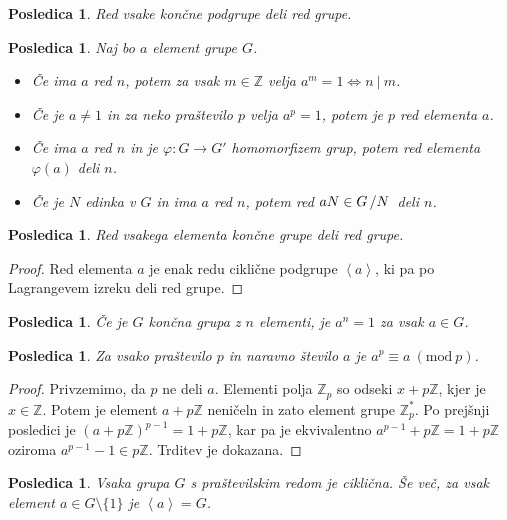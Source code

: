 \documentclass[10pt, a4paper]{article}
\newtheorem{posledica}[izr]{Posledica}
\newenvironment{noticeC}{%
  \tcolorbox[%
  notitle,
  empty,
  enhanced,  %
  breakable,
  coltext=black, 
  fontupper=\rmfamily,
  noparskip,
  sharp corners,
  boxrule=-1pt,  %
  frame hidden,
  left=7pt,  %
  right=7pt,
  top=5pt,
  bottom=5pt,
  before skip=2.5ex plus 2pt,
  after skip=2.5ex plus 2pt,
  overlay unbroken and last={%
  },
  ]}
{\endtcolorbox}
\newenvironment{dokaz}%
  {\begin{noticeC}\begin{proof}}%
  {\end{proof}\end{noticeC}}
\newcommand{\Z}{\mathbb {Z}}
\newcommand{\quot}[2]{{\raisebox{0em}{$#1$}\left/\raisebox{0em}{$#2$}\right.}}
\newcommand{\gen}[1]{\left\langle #1 \right\rangle}
\newcommand{\Mod}[1]{\ (\mathrm{mod}\ #1)}
\begin{document}
\begin{posledica}
  Red vsake končne podgrupe deli red grupe.
\end{posledica}

\begin{posledica}\label{pos:1}
  Naj bo $a$ element grupe $G$.
  \begin{itemize}
    \item Če ima $a$ red $n$, potem za vsak $m \in \Z$ velja $a^m = 1 \Leftrightarrow n\ |\ m$.
    \item Če je $a \neq 1$ in za neko praštevilo $p$ velja $a^p = 1$, potem je $p$ red elementa $a$.
    \item Če ima $a$ red $n$ in je $\varphi: G \to G'$ homomorfizem grup, potem red elementa $\varphi(a)$ deli $n$.
    \item Če je $N$ edinka v $G$ in ima $a$ red $n$, potem red $aN \in \quot{G}{N}$ deli $n$.
  \end{itemize}
\end{posledica}

\begin{posledica}
  Red vsakega elementa končne grupe deli red grupe.
\end{posledica}

\begin{dokaz}
  Red elementa $a$ je enak redu ciklične podgrupe $\gen{a}$, ki pa po Lagrangevem izreku deli red grupe.
\end{dokaz}

\begin{posledica}
  Če je $G$ končna grupa z $n$ elementi, je $a^n = 1$ za vsak $a \in G$.
\end{posledica}

\begin{posledica}
  Za vsako praštevilo $p$ in naravno število $a$ je $a^p \equiv a \Mod{p}$.
\end{posledica}

\begin{dokaz}
  Privzemimo, da $p$ ne deli $a$. Elementi polja $\Z_p$ so odseki $x + p\Z$,
  kjer je $x \in \Z$. Potem je element $a + p\Z$ neničeln in zato element 
  grupe $\Z_p^*$. Po prejšnji posledici je $(a + p\Z)^{p -1} = 1 + p\Z$,
  kar pa je ekvivalentno $a^{p-1} + p\Z = 1 + p\Z$ oziroma $a^{p-1} -1 \in p\Z$.
  Trditev je dokazana.
\end{dokaz}

\begin{posledica}
  Vsaka grupa $G$ s praštevilskim redom je ciklična.
  Še več, za vsak element $a \in G \setminus \{1\}$ je $\gen{a} = G$.
\end{posledica}
\end{document}
